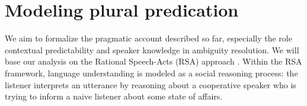 \documentclass[linguex]{sp}
\newcommand{\sem}[1]{\mbox{$[\![$#1$]\!]$}}
\newcommand{\ndg}[1]{\textcolor{Green}{[ndg: #1]}}
\begin{document}
\section{Modeling plural predication}
\label{model}


We aim to formalize the pragmatic account described so far, especially the role contextual predictability and speaker knowledge in ambiguity resolution.
We will base our analysis on the Rational Speech-Acts (RSA) approach \citep{frankgoodman2012,goodmanstuhlmuller2013}. Within the RSA framework, language understanding is modeled as a social reasoning process: the listener interprets an utterance by reasoning about a cooperative speaker who is trying to inform a naive listener about some state of affairs. 

\end{document}
